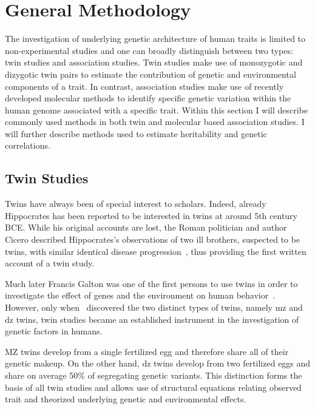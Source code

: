 \chapter{General Methodology}
\label{cha:methods_applied_in_genetic_studies_on_humans}

The investigation of underlying genetic architecture of human traits is limited to non-experimental studies and one can broadly distinguish between two types: twin studies and association studies.
Twin studies make use of monozygotic and dizygotic twin pairs to estimate the contribution of genetic and environmental components of a trait.
In contrast, association studies make use of recently developed molecular methods to identify specific genetic variation within the human genome associated with a specific trait.
Within this section I will describe commonly used methods in both twin and molecular based association studies.
I will further describe methods used to estimate heritability and genetic correlations.

\section{Twin Studies}
\label{sec:twin_based_studies}

Twins have always been of special interest to scholars.
Indeed, already Hippocrates has been reported to be interested in twins at around 5th century BCE\@.
While his original accounts are lost, the Roman politician and author Cicero described Hippocrates's observations of two ill brothers, suspected to be twins, with similar identical disease progression~\cite{Cicero44BC},
thus providing the first written account of a twin study.

Much later Francis Galton was one of the first persons to use twins in order to investigate the effect of genes and the environment on human behavior~\cite{Rende1990}.
However, only when~\citet{Simens1924} discovered the two distinct types of twins, namely \acrfull{mz} and \acrfull{dz} twins, twin studies became an established instrument in the investigation of genetic factors in humans.

MZ twins develop from a single fertilized egg and therefore share all of their genetic makeup.
On the other hand, \acrshort{dz} twins develop from two fertilized eggs and share on average 50\% of segregating genetic variants.
This distinction forms the basis of all twin studies and allows use of structural equations relating observed trait and theorized underlying genetic and environmental effects.

